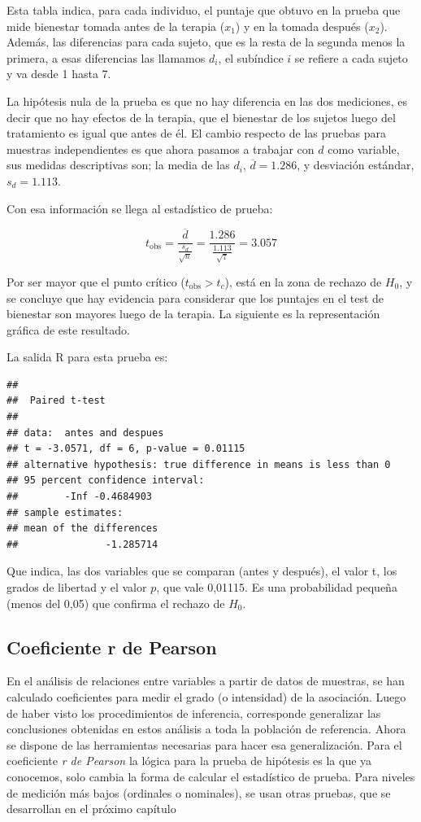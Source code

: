 \documentclass[]{book}
\begin{document}
Esta tabla indica, para cada individuo, el puntaje que obtuvo en la
prueba que mide bienestar tomada antes de la terapia (\(x_1\)) y en la
tomada después (\(x_2\)). Además, las diferencias para cada sujeto, que
es la resta de la segunda menos la primera, a esas diferencias las
llamamos \(d_i\), el subíndice \(i\) se refiere a cada sujeto y va desde 1
hasta 7.

La hipótesis nula de la prueba es que no hay diferencia en las dos
mediciones, es decir que no hay efectos de la terapia, que el bienestar
de los sujetos luego del tratamiento es igual que antes de él. El cambio
respecto de las pruebas para muestras independientes es que ahora
pasamos a trabajar con \(d\) como variable, sus medidas descriptivas son;
la media de las \(d_i\), \(\overline{d} = 1.286\), y desviación estándar,
\(s_{d} = 1.113\).

Con esa información se llega al estadístico de prueba:

\[t_{\text{obs}} = \frac{\overline{d}}{\frac{s_{d}}{\sqrt{n}}} = \frac{1.286}{\frac{1.113}{\sqrt{7}}} = 3.057\]

Por ser mayor que el punto crítico (\(t_{\text{obs}} > t_{c}\)), está en
la zona de rechazo de \(H_0\), y se concluye que hay evidencia para
considerar que los puntajes en el test de bienestar son mayores luego de la terapia. La siguiente es la representación gráfica de este resultado.

La salida R para esta prueba es:

\begin{verbatim}
## 
##  Paired t-test
## 
## data:  antes and despues
## t = -3.0571, df = 6, p-value = 0.01115
## alternative hypothesis: true difference in means is less than 0
## 95 percent confidence interval:
##        -Inf -0.4684903
## sample estimates:
## mean of the differences 
##               -1.285714
\end{verbatim}

Que indica, las dos variables que se comparan (antes y después), el valor t, los grados de libertad y el valor \(p\), que
vale 0,01115. Es una probabilidad pequeña (menos del 0,05) que confirma
el rechazo de \(H_0\).

\hypertarget{coeficiente-r-de-pearson}{%
\subsection{Coeficiente r de Pearson}\label{coeficiente-r-de-pearson}}

En el análisis de relaciones entre variables a partir de datos de
muestras, se han calculado coeficientes para medir el grado (o
intensidad) de la asociación. Luego de haber visto los procedimientos de
inferencia, corresponde generalizar las conclusiones obtenidas en estos
análisis a toda la población de referencia. Ahora se dispone de las
herramientas necesarias para hacer esa generalización. Para el
coeficiente \emph{r de Pearson} la lógica para la prueba de hipótesis es la
que ya conocemos, solo cambia la forma de calcular el estadístico de
prueba. Para niveles de medición más bajos (ordinales o nominales), se
usan otras pruebas, que se desarrollan en el próximo capítulo
\end{document}
